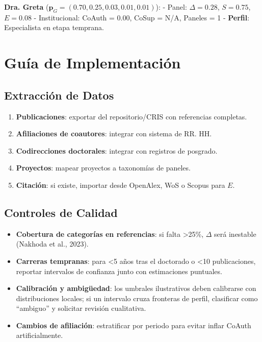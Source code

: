 \documentclass[
]{article}
\providecommand{\tightlist}{%
  \setlength{\itemsep}{0pt}\setlength{\parskip}{0pt}}
\begin{document}
\textbf{Dra. Greta} (\(\mathbf{p}_G = (0.70, 0.25, 0.03, 0.01, 0.01)\)):
- Panel: \(\Delta = 0.28\), \(S = 0.75\), \(E = 0.08\) - Institucional:
CoAuth = 0.00, CoSup = N/A, Paneles = 1 - \textbf{Perfil}: Especialista
en etapa temprana.

\hypertarget{guuxeda-de-implementaciuxf3n}{%
\section{Guía de Implementación}\label{guuxeda-de-implementaciuxf3n}}

\hypertarget{extracciuxf3n-de-datos}{%
\subsection{Extracción de Datos}\label{extracciuxf3n-de-datos}}

\begin{enumerate}
\def\labelenumi{\arabic{enumi}.}
\tightlist
\item
  \textbf{Publicaciones}: exportar del repositorio/CRIS con referencias
  completas.
\item
  \textbf{Afiliaciones de coautores}: integrar con sistema de RR. HH.
\item
  \textbf{Codirecciones doctorales}: integrar con registros de posgrado.
\item
  \textbf{Proyectos}: mapear proyectos a taxonomías de paneles.
\item
  \textbf{Citación}: si existe, importar desde OpenAlex, WoS o Scopus
  para \(E\).
\end{enumerate}

\hypertarget{controles-de-calidad}{%
\subsection{Controles de Calidad}\label{controles-de-calidad}}

\begin{itemize}
\tightlist
\item
  \textbf{Cobertura de categorías en referencias}: si falta
  \textgreater25\%, \(\Delta\) será inestable (Nakhoda et al., 2023).
\item
  \textbf{Carreras tempranas}: para \textless5 años tras el doctorado o
  \textless10 publicaciones, reportar intervalos de confianza junto con
  estimaciones puntuales.
\item
  \textbf{Calibración y ambigüedad}: los umbrales ilustrativos deben
  calibrarse con distribuciones locales; si un intervalo cruza fronteras
  de perfil, clasificar como ``ambiguo'' y solicitar revisión
  cualitativa.
\item
  \textbf{Cambios de afiliación}: estratificar por periodo para evitar
  inflar CoAuth artificialmente.
\end{itemize}
\end{document}
